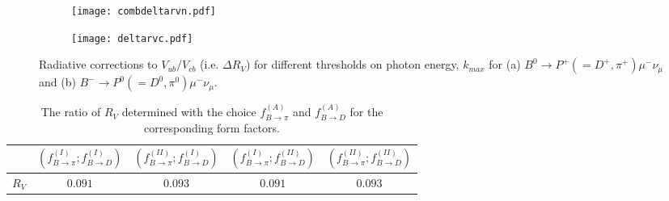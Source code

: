 \documentclass[a4paper,11pt]{article}
\begin{document}
	  \begin{figure}[h]
     \begin{subfigure}{.5\textwidth}
	 		\centering
	 		\texttt{[image: combdeltarvn.pdf]}
	 		\caption{}
	 	\end{subfigure}
     \begin{subfigure}{.5\textwidth}
	 		\centering
	 		\texttt{[image: deltarvc.pdf]}
	 		\caption{}
	 	\end{subfigure}%
     	\caption{Radiative corrections to $V_{ub}/V_{cb}$ (i.e. $\Delta{R_V}$) for different thresholds on photon energy, $k_{max}$ for (a) $B^0 \rightarrow P^+(=D^+,\pi^+) \mu^- \nu_\mu$ and (b) $B^- \rightarrow P^0(=D^0,\pi^0) \mu^- \nu_\mu$.}
	 	\label{fig6}
	 \end{figure} 
	\begin{table}[h]
	   \centering
    \begin{tabular}{ |c| c| c|c|c|}
    \hline
    {  }  & {$(f_{B\to\pi}^{(I)};f_{B\to D}^{(I)})$} & {$(f_{B\to \pi}^{(II)};f_{B\to D}^{(I)})$} & {$(f_{B\to\pi}^{(I)};f_{B\to D}^{(II)})$} &
    {$(f_{B\to \pi}^{(II)};f_{B\to D}^{(II)})$}\\
    \hline
    {$R_V$}& {$0.091$} & {$0.093$} & {$0.091$} & {$0.093$}    \\
    \hline
    \end{tabular}\\
    \label{table2}
	    \caption{ The ratio of $R_V$ determined with the choice $f_{B\to \pi}^{(A)}$ and $f_{B\to D}^{(A)}$ for the corresponding form factors.}
	    \label{tabel3}
	\end{table}
\end{document}
